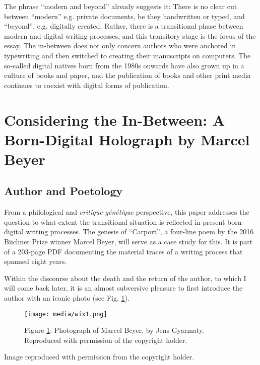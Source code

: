 \documentclass{article}
\begin{document}
The phrase ``modern and beyond'' already suggests it: There is no clear
cut between ``modern'' e.g. private documents, be they handwritten or
typed, and ``beyond'', e.g. digitally created. Rather, there is a
transitional phase between modern and digital writing processes, and
this transitory stage is the focus of the essay. The in-between does not
only concern authors who were anchored in typewriting and then switched
to creating their manuscripts on computers. The so-called digital
natives born from the 1980s onwards have also grown up in a culture of
books and paper, and the publication of books and other print media continues
to coexist with digital forms of publication.

\section*{Considering the In-Between: A Born-Digital Holograph by Marcel Beyer}

\subsection*{Author and Poetology}

From a philological and \emph{critique génétique} perspective, this paper
addresses the question to what extent the transitional situation is
reflected in present born-digital writing processes. The genesis of
``Carport'', a four-line poem by the 2016 Büchner Prize winner Marcel
Beyer, will serve as a case study for this. It is part of a 203-page PDF
documenting the material traces of a writing process that spanned eight
years.

Within the discourse about the death and the return of the author, to
which I will come back later, it is an almost subversive pleasure to first
introduce the author with an iconic photo (see Fig. \ref{fig:wix1}).

\begin{figure}[H]
    \centering
    \texttt{[image: media/wix1.png]}
    \caption{Figure \ref{fig:wix1}: Photograph of Marcel Beyer, by Jens Gyarmaty. Reproduced with permission of the copyright holder.}
    \label{fig:wix1}
\end{figure}

Image reproduced with permission from the copyright holder.
\end{document}
